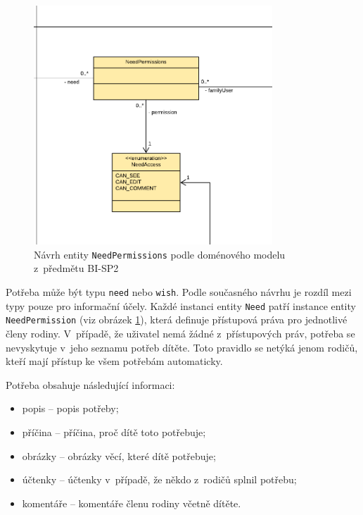        \begin{figure}\centering
	        \includegraphics[width=0.8\textwidth]{pdfs/NeedPermissions1}
	        \caption[Návrh entity \texttt{NeedPermissions}]{Návrh entity \texttt{NeedPermissions} podle doménového modelu z~předmětu BI-SP2}\label{image:NeedPermissions1}
        \end{figure}
        Potřeba může být typu \verb|need| nebo \verb|wish|. Podle současného návrhu je rozdíl mezi typy pouze pro informační účely. Každé instanci entity \verb|Need| patří instance entity \verb|NeedPermission| (viz obrázek \ref{image:NeedPermissions1}), která definuje přístupová práva pro jednotlivé členy rodiny. V~případě, že uživatel nemá žádné z~přístupových práv, potřeba se nevyskytuje v~jeho seznamu potřeb dítěte. Toto pravidlo se netýká jenom rodičů, kteří mají přístup ke všem potřebám automaticky.
       
       Potřeba obsahuje následující informaci:
        \begin{itemize}
            \setlength\itemsep{0.3em}
            \item popis -- popis potřeby;
            \item příčina -- příčina, proč dítě toto potřebuje;
            \item obrázky -- obrázky věcí, které dítě potřebuje;
            \item účtenky -- účtenky v~případě, že někdo z~rodičů splnil potřebu;
            \item komentáře -- komentáře členu rodiny včetně dítěte.
        \end{itemize}
    
